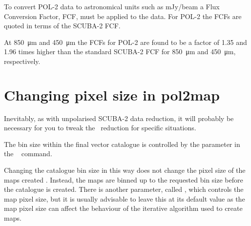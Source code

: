 To convert POL-2 data to astronomical units such as mJy/beam a Flux Conversion
Factor, FCF, must be applied to the data. For POL-2 the FCFs are quoted in terms of
the SCUBA-2 FCF.

At \SI{850}{\micro\metre} and \SI{450}{\micro\metre} the FCFs for POL-2
are found to be a factor of 1.35 and 1.96 times higher than the
standard SCUBA-2 FCF for \SI{850}{\micro\metre} and \SI{450}{\micro\metre}, respectively.


\section{Changing pixel size in pol2map}
\label{sec:pol2map-pixelsize}

Inevitably, as with unpolarised SCUBA-2 data reduction, it will
probably be necessary for you to tweak the \poltwomap\ reduction for
specific situations.

The bin size within the final vector catalogue is controlled by the
 parameter in the \SMURF\  command.

\begin{terminalv}
\end{terminalv}

Changing the catalogue bin size in this way does not change the pixel
size of the maps created . Instead, the maps are binned up
to the requested bin size before the catalogue is created. There is
another parameter, called , which controls the map pixel
size, but it is usually advisable to leave this at its default value
as the map pixel size can affect the behaviour of the iterative algorithm
used to create maps.







